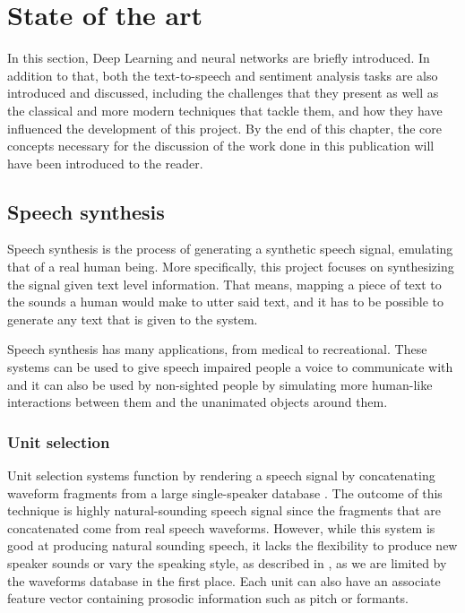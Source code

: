 \chapter{State of the art}

In this section, Deep Learning and neural networks are briefly introduced. In addition to that, both the text-to-speech and sentiment analysis tasks are also introduced and discussed, including the challenges that they present as well as the classical and more modern techniques that tackle them, and how they have influenced the development of this project. By the end of this chapter, the core concepts necessary for the discussion of the work done in this publication will have been introduced to the reader.

\section{Speech synthesis}

Speech synthesis is the process of generating a synthetic speech signal, emulating that of a real human being. More specifically, this project focuses on synthesizing the signal given text level information. That means, mapping a piece of text to the sounds a human would make to utter said text, and it has to be possible to generate any text that is given to the system.

Speech synthesis has many applications, from medical to recreational. These systems can be used to give speech impaired people a voice to communicate with and it can also be used by non-sighted people by simulating more human-like interactions between them and the unanimated objects around them.


\subsection{Unit selection}

Unit selection systems function by rendering a speech signal by concatenating waveform fragments from a large single-speaker database \cite{hunt1996unit}. The outcome of this technique is highly natural-sounding speech signal since the fragments that are concatenated come from real speech waveforms. However, while this system is good at producing natural sounding speech, it lacks the flexibility to produce new speaker sounds or vary the speaking style, as described in \cite{jauk2015creating}, as we are limited by the waveforms database in the first place. Each unit can also have an associate feature vector containing prosodic information such as pitch or formants.

